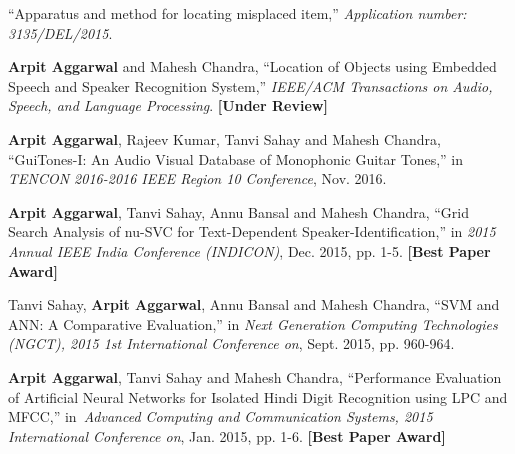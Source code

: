 \vspace{-1em}
\begin{cventries}
\cventry
{}
{}
{}
{}
{
 \begin{cvlist}
	\item ``Apparatus and method for locating misplaced item,'' \textit{Application number: 3135/DEL/2015}.
 \end{cvlist}
}
\cventry
{}
{}
{}
{}
{\begin{cvlist}
	\item \textbf{Arpit Aggarwal} and Mahesh Chandra, ``Location of Objects using Embedded Speech and Speaker Recognition System,'' \textit{IEEE/ACM Transactions on Audio, Speech, and Language Processing}. \textbf{[\scriptsize Under Review]}
 \end{cvlist}
 }
\cventry
{}
{}
{}
{}
{\begin{cvlist}
	\item \textbf{Arpit Aggarwal}, Rajeev Kumar, Tanvi Sahay and Mahesh Chandra, ``GuiTones-I: An Audio Visual Database of Monophonic Guitar Tones,'' in \textit{TENCON 2016-2016 IEEE Region 10 Conference}, Nov. 2016. \href{http://ieeexplore.ieee.org/document/7848049}{}
	\item \textbf{Arpit Aggarwal}, Tanvi Sahay, Annu Bansal and Mahesh Chandra, ``Grid Search Analysis of nu-SVC for Text-Dependent Speaker-Identiﬁcation,'' in \textit{2015 Annual IEEE India Conference (INDICON)}, Dec. 2015, pp. 1-5. \textbf{[\scriptsize Best Paper Award]} \href{http://ieeexplore.ieee.org/document/7443790}{}
	\item Tanvi Sahay, \textbf{Arpit Aggarwal}, Annu Bansal and Mahesh Chandra, ``SVM and ANN: A Comparative Evaluation,'' in \textit{Next Generation Computing Technologies (NGCT), 2015 1st International Conference on}, Sept. 2015, pp. 960-964. \href{http://ieeexplore.ieee.org/document/7375263}{}
	\item \textbf{Arpit Aggarwal}, Tanvi Sahay and Mahesh Chandra, ``Performance Evaluation of Artificial Neural Networks for Isolated Hindi Digit Recognition using LPC and MFCC,'' in~\textit{Advanced Computing and Communication Systems, 2015 International Conference on}, Jan. 2015, pp. 1-6. \textbf{[\scriptsize Best Paper Award]} \href{http://ieeexplore.ieee.org/document/7324099}{}
\end{cvlist}
}
\end{cventries}





